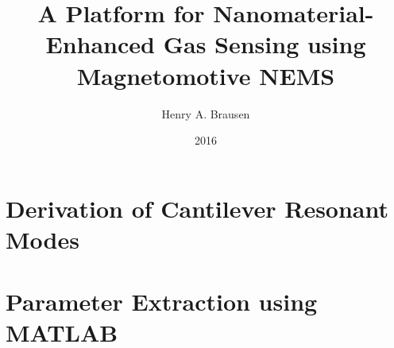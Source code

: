 \documentclass[11pt,letterpaper,oneside]{book}
\title{A Platform for Nanomaterial-Enhanced Gas Sensing using Magnetomotive NEMS}
\author{Henry A. Brausen}
\date{2016}
\begin{document}
\onehalfspacing	%

\frontmatter	%



\setcounter{page}{2}









\tableofcontents

\listoftables

\listoffigures





\mainmatter	%













\cleardoublepage
{}
{}


\appendix
\chapter{Derivation of Cantilever Resonant Modes}
\chapter{Parameter Extraction using MATLAB}
\end{document}
